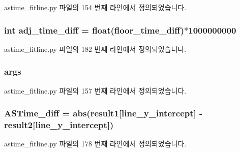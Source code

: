 astime\+\_\+fitline.\+py 파일의 154 번째 라인에서 정의되었습니다.

\subsubsection[{\texorpdfstring{adj\+\_\+time\+\_\+diff}{adj_time_diff}}]{\setlength{\rightskip}{0pt plus 5cm}int adj\+\_\+time\+\_\+diff = float({\bf floor\+\_\+time\+\_\+diff})$\ast$1000000000}\hypertarget{namespaceastime__fitline_a65c89e65105f3b544b41f14b93aaad4d}{}\label{namespaceastime__fitline_a65c89e65105f3b544b41f14b93aaad4d}


astime\+\_\+fitline.\+py 파일의 182 번째 라인에서 정의되었습니다.

\subsubsection[{\texorpdfstring{args}{args}}]{\setlength{\rightskip}{0pt plus 5cm}args}\hypertarget{namespaceastime__fitline_a8187411843a6284ffb964ef3fb9fcab3}{}\label{namespaceastime__fitline_a8187411843a6284ffb964ef3fb9fcab3}


astime\+\_\+fitline.\+py 파일의 157 번째 라인에서 정의되었습니다.

\subsubsection[{\texorpdfstring{A\+S\+Time\+\_\+diff}{ASTime_diff}}]{\setlength{\rightskip}{0pt plus 5cm}A\+S\+Time\+\_\+diff = abs({\bf result1}\mbox{[}\textquotesingle{}line\+\_\+y\+\_\+intercept\textquotesingle{}\mbox{]} -\/ {\bf result2}\mbox{[}\textquotesingle{}line\+\_\+y\+\_\+intercept\textquotesingle{}\mbox{]})}\hypertarget{namespaceastime__fitline_a0e060fdf8a47d84b5e6de204015946fe}{}\label{namespaceastime__fitline_a0e060fdf8a47d84b5e6de204015946fe}


astime\+\_\+fitline.\+py 파일의 178 번째 라인에서 정의되었습니다.

